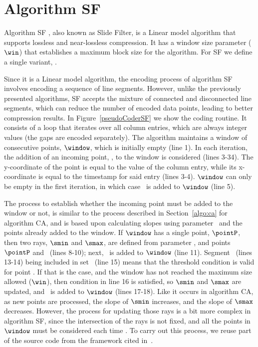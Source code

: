 
\clearpage

\section{Algorithm SF}
\label{algo:sf}

Algorithm SF \cite{coder:sf}, also known as Slide Filter, is a Linear model algorithm that supports lossless and near-lossless compression. It has a window size parameter ($\win$) that establishes a maximum block size for the algorithm. For SF we define a single variant, \maskalgo.


Since it is a Linear model algorithm, the encoding process of algorithm SF involves encoding a sequence of line segments. However, unlike the previously presented algorithms, SF accepts the mixture of connected and disconnected line segments, which can reduce the number of encoded data points, leading to better compression results. In Figure~\ref{pseudoCoderSF} we show the coding routine. It consists of a loop that iterates over all column entries, which are always integer values (the gaps are encoded separately). The algorithm maintains a window of consecutive points, $\window$, which is initially empty (line 1). In each iteration, the addition of an incoming point, \point, to the window is considered (lines 3-34). The y-coordinate of the point is equal to the value of the column entry, while its x-coordinate is equal to the timestamp for said entry (lines 3-4). $\window$ can only be empty in the first iteration, in which case \point\ is added to $\window$ (line 5). 


The process to establish whether the incoming point must be added to the window or not, is similar to the process described in Section~\ref{algo:ca} for algorithm CA, and is based upon calculating slopes using parameter \maxerror\ and the points already added to the window. If $\window$ has a single point, $\pointP$, then two rays, $\smin$ and $\smax$, are defined from parameter \maxerror, and points $\pointP$ and \point\ (lines 8-10); next, \point\ is added to $\window$ (line 11). Segment \EseE\ (lines 13-14) being included in set \segmentSet\ (line 15) means that the threshold condition is valid for point \point. If that is the case, and the window has not reached the maximum size allowed ($\win$), then condition in line 16 is satisfied, so $\smin$ and $\smax$ are updated, and \point\ is added to $\window$ (lines 17-18). Like it occurs in algorithm CA, as new points are processed, the slope of $\smin$ increases, and the slope of $\smax$ decreases. However, the process for updating those rays is a bit more complex in algorithm SF, since the intersection of the rays is not fixed, and all the points in $\window$ must be considered each time \cite{coder:sf}. To carry out this process, we reuse part of the source code from the framework cited in~\cite{AnEva2013}.


